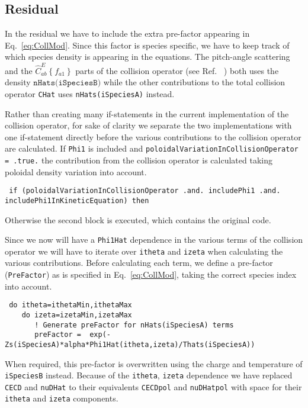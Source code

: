 \documentclass[12pt]{article}
\begin{document}
\subsection*{Residual}
\label{sec:Res}
In the residual we have to include the extra pre-factor appearing in Eq.~\eqref{eq:CollMod}. Since this factor is species specific, we have to keep track of which species density is appearing in the equations. The pitch-angle scattering and the $\hat C^E_{ab}\left \{f_{a1}\right \}$ parts of the collision operator (see Ref. ~\cite{ref:Coll1}) both uses the density $\texttt{nHats(iSpeciesB)}$ while the other contributions to the total collision operator \texttt{CHat} uses \texttt{nHats(iSpeciesA)} instead. 

Rather than creating many if-statements in the current implementation of the collision operator, for sake of clarity we separate the two implementations with one if-statement directly before the various contributions to the collision operator are calculated. If \texttt{Phi1} is included and \texttt{poloidalVariationInCollisionOperator = .true.} the contribution from the collision operator is calculated taking poloidal density variation into account. 

\begin{lstlisting}
 if (poloidalVariationInCollisionOperator .and. includePhi1 .and. includePhi1InKineticEquation) then
\end{lstlisting}

Otherwise the second block is executed, which contains the original code. 

\noindent
Since we now will have a \texttt{Phi1Hat} dependence in the various terms of the collision operator we will have to iterate over \texttt{itheta} and \texttt{izeta} when calculating the various contributions. Before calculating each term, we define a pre-factor (\texttt{PreFactor}) as is specified in Eq.~\eqref{eq:CollMod}, taking the correct species index into account. 

\begin{lstlisting}
 do itheta=ithetaMin,ithetaMax
    do izeta=izetaMin,izetaMax
       ! Generate preFactor for nHats(iSpeciesA) terms
       preFactor =  exp(-Zs(iSpeciesA)*alpha*Phi1Hat(itheta,izeta)/Thats(iSpeciesA))
\end{lstlisting}

\noindent
When required, this pre-factor is overwritten using the charge and temperature of \texttt{iSpeciesB} instead. 
Because of the \texttt{itheta}, \texttt{izeta} dependence we have replaced \texttt{CECD} and \texttt{nuDHat} to their equivalents \texttt{CECDpol} and \texttt{nuDHatpol} with space for their \texttt{itheta} and \texttt{izeta} components. 
\end{document}
